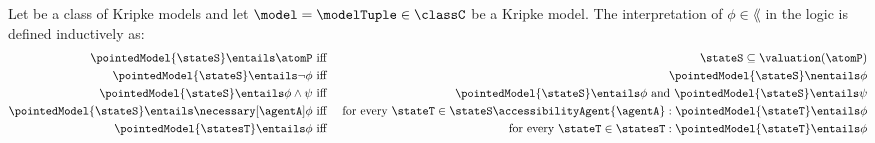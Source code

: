 \documentclass[twoside]{aiml14}
\begin{document}
  \begin{definition}\label{ml-semantics}
  Let \classC{} be a class of Kripke models and let $\model = \modelTuple \in
  \classC$ be a Kripke model.
  The interpretation of $\phi \in \lang$ in the logic \logicC{} is defined 
  inductively as:
  \begin{eqnarray*}
      \pointedModel{\stateS} \entails \atomP &\text{ iff }& \stateS \subseteq \valuation(\atomP)\\
      \pointedModel{\stateS} \entails \neg \phi &\text{ iff }& \pointedModel{\stateS} \nentails \phi\\
      \pointedModel{\stateS} \entails \phi \land \psi &\text{ iff }& \pointedModel{\stateS} \entails \phi \text{ and } \pointedModel{\stateS} \entails \psi\\
      \pointedModel{\stateS} \entails \necessary[\agentA] \phi &\text{ iff }& \text{for every } \stateT \in \stateS \accessibilityAgent{\agentA} : \pointedModel{\stateT} \entails \phi\\
      \pointedModel{\statesT} \entails \phi &\text{ iff }& \text{for every } \stateT \in \statesT : \pointedModel{\stateT} \entails \phi
  \end{eqnarray*}
  \end{definition}
\end{document}
